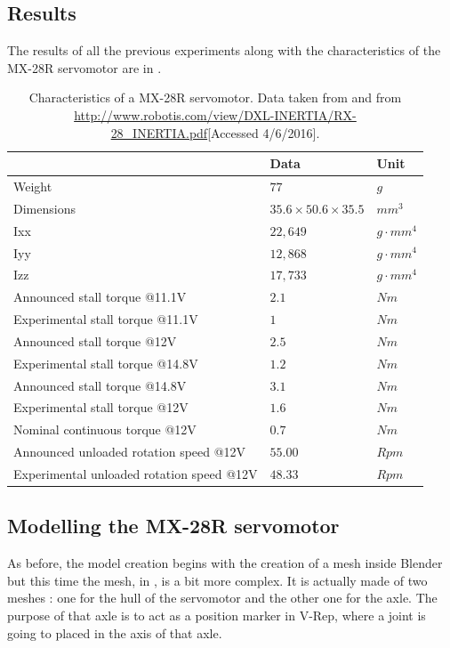 \subsection{Results}
The results of all the previous experiments along with the characteristics of the MX-28R servomotor are in .
\begin{table}[htp]
\begin{tabularx}{\textwidth}{@{} l X X @{}}
\toprule
& \textbf{Data} & \textbf{Unit}\\ 
\midrule
Weight & $77$ & $g$\\
Dimensions & $35.6 \times 50.6 \times 35.5$ & $mm^3$\\
Ixx & $22,649$ & $g \cdot mm^4$\\
Iyy & $12,868$ & $g \cdot mm^4$\\
Izz & $17,733$ & $g \cdot mm^4$ \\
Announced stall torque @11.1V & $2.1$ & $Nm$\\
Experimental stall torque @11.1V & $1$ & $Nm$\\
Announced stall torque @12V & $2.5$ & $Nm$\\
Experimental stall torque @14.8V & $1.2$ & $Nm$\\
Announced stall torque @14.8V & $3.1$ & $Nm$\\
Experimental stall torque @12V & $1.6$ & $Nm$\\
Nominal continuous torque @12V & $0.7$ & $Nm$\\
Announced unloaded rotation speed @12V & $55.00$ & $Rpm$\\
Experimental unloaded rotation speed @12V & $48.33$ & $Rpm$\\
\bottomrule
\end{tabularx}
\caption[Characteristics of a MX-28R servomotor]{Characteristics of a MX-28R servomotor. Data taken from \cite{mx_28_manual} and from \url{http://www.robotis.com/view/DXL-INERTIA/RX-28_INERTIA.pdf}[Accessed 4/6/2016].}
\label{table:mx28-specs}
\end{table} 

\clearpage
\subsection{Modelling the MX-28R servomotor}
As before, the model creation begins with the creation of a mesh inside Blender but this time the mesh, in , is a bit more complex. It is actually made of two meshes : one for the hull of the servomotor and the other one for the axle. The purpose of that axle is to act as a position marker in V-Rep, where a joint is going to placed in the axis of that axle. 

